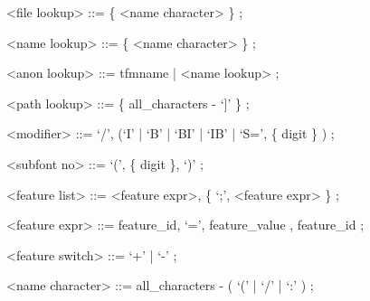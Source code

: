       <file lookup>      ::= \{ <name character> \} ;

      <name lookup>      ::= \{ <name character> \} ;

      <anon lookup>      ::= {\sc tfmname} | <name lookup> ;

      <path lookup>      ::= \{ {\sc all_characters} - `]' \} ;

      <modifier>         ::= `/', (`I' | `B' | `BI' | `IB' | `S=', \{ {\sc digit} \} ) ;

      <subfont no>       ::= `(', \{ {\sc digit} \}, `)' ;

      <feature list>     ::= <feature expr>, \{ `;', <feature expr> \} ;

      <feature expr>     ::= {\sc feature_id}, `=', {\sc feature_value}
      , {\sc feature_id} ;

      <feature switch>   ::= `+' | `-' ;

      <name character>   ::= {\sc all_characters} - ( `(' | `/' | `:' ) ;
\endsyntaxfloat


